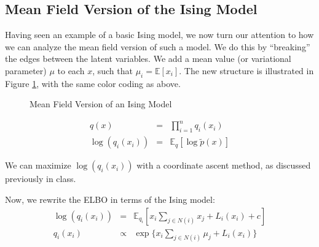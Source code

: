 \documentclass[twoside]{article}
\begin{document}
{\subsection{Mean Field Version of the Ising Model}

Having seen an example of a basic Ising model, we now turn our attention to how we can analyze the mean field version of such a model. We do this by ``breaking'' the edges between the latent variables. We add a mean value (or variational parameter) $\mu$ to each $x$, such that $\mu_i=\mathbb{E}[x_i]$. The new structure is illustrated in Figure \ref{meanfield}, with the same color coding as above. 

\begin{figure}[h!]
\begin{center}
\end{center}
\caption{Mean Field Version of an Ising Model}
\label{meanfield}
\end{figure}


\begin{eqnarray*}
q(x) &=& \prod_{i=1}^n q_i (x_i) \\
\log ( q_i (x_i)) &=& \mathbb{E}_q [ \log \tilde{p}(x) ]
\end{eqnarray*}

We can maximize $\log ( q_i (x_i))$ with a coordinate ascent method, as discussed previously in class.

Now, we rewrite the ELBO in terms of the Ising model:
\begin{eqnarray*}
\log (q_i (x_i)) &=& \mathbb{E}_{q_i} [ x_i \sum_{j \in N(i)} x_j + L_i(x_i) +c ] \\
q_i (x_i) &\propto& \exp \{ x_i \sum_{j \in N(i)} \mu_j + L_i(x_i) \}
\end{eqnarray*}

}
\end{document}
